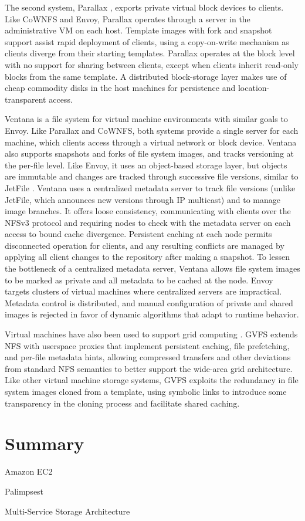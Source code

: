 The second system, Parallax \cite{warfield}, exports private virtual block devices to clients. Like CoWNFS and Envoy, Parallax operates through a server in the administrative VM on each host. Template images with fork and snapshot support assist rapid deployment of clients, using a copy-on-write mechanism as clients diverge from their starting templates. Parallax operates at the block level with no support for sharing between clients, except when clients inherit read-only blocks from the same template. A distributed block-storage layer makes use of cheap commodity disks in the host machines for persistence and location-transparent access.

Ventana \cite{pfaff} is a file system for virtual machine environments with similar goals to Envoy. Like Parallax and CoWNFS, both systems provide a single server for each machine, which clients access through a virtual network or block device. Ventana also supports snapshots and forks of file system images, and tracks versioning at the per-file level. Like Envoy, it uses an object-based storage layer, but objects are immutable and changes are tracked through successive file versions, similar to JetFile \cite{gronvall}. Ventana uses a centralized metadata server to track file versions (unlike JetFile, which announces new versions through IP multicast) and to manage image branches. It offers loose consistency, communicating with clients over the NFSv3 protocol and requiring nodes to check with the metadata server on each access to bound cache divergence. Persistent caching at each node permits disconnected operation for clients, and any resulting conflicts are managed by applying all client changes to the repository after making a snapshot. To lessen the bottleneck of a centralized metadata server, Ventana allows file system images to be marked as private and all metadata to be cached at the node. Envoy targets clusters of virtual machines where centralized servers are impractical. Metadata control is distributed, and manual configuration of private and shared images is rejected in favor of dynamic algorithms that adapt to runtime behavior.

Virtual machines have also been used to support grid computing \cite{figueiredo03}. GVFS \cite{zhao04} extends NFS with userspace proxies that implement persistent caching, file prefetching, and per-file metadata hints, allowing compressed transfers and other deviations from standard NFS semantics to better support the wide-area grid architecture. Like other virtual machine storage systems, GVFS exploits the redundancy in file system images cloned from a template, using symbolic links to introduce some transparency in the cloning process and facilitate shared caching.

\section{Summary}

Amazon EC2 \cite{amazon}

Palimpsest \cite{roscoe03}

Multi-Service Storage Architecture \cite{bacon}